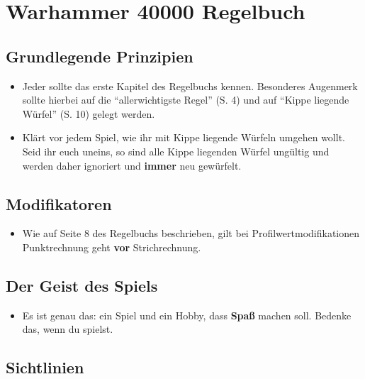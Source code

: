 \section{Warhammer 40000 Regelbuch}

\subsection{Grundlegende Prinzipien}

\begin{itemize}

 \item Jeder sollte das erste Kapitel des Regelbuchs kennen. Besonderes
  Augenmerk sollte hierbei auf die ``allerwichtigste Regel'' (S. 4) und auf
  ``Kippe liegende Würfel'' (S. 10) gelegt werden.

\item Klärt vor jedem Spiel, wie ihr mit Kippe liegende Würfeln umgehen wollt.
 Seid ihr euch uneins, so sind alle Kippe liegenden Würfel ungültig und werden
 daher ignoriert und \textbf{immer} neu gewürfelt.

\end{itemize}

\subsection{Modifikatoren}

\begin{itemize}

 \item Wie auf Seite 8 des Regelbuchs beschrieben, gilt bei
  Profilwertmodifikationen Punktrechnung geht \textbf{vor} Strichrechnung.

\end{itemize}

\subsection{Der Geist des Spiels}

\begin{itemize}

 \item Es ist genau das: ein Spiel und ein Hobby, dass \textbf{Spaß} machen
  soll.  Bedenke das, wenn du spielst.

\end{itemize}

\subsection{Sichtlinien}

